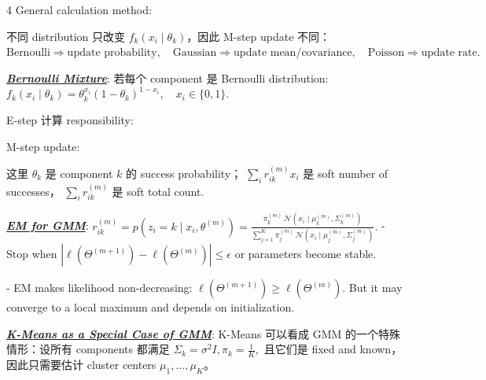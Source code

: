 \documentclass[12pt]{article}
\newcommand{\bulletPoint}[1]{\underline{\textit{\textbf{#1}}}}
\begin{document}
\begin{multicols*}{4}
General calculation method:
{}
{}

不同 distribution 只改变 $f_k(x_i\mid\theta_k)$，因此 M-step update 不同：
$
\text{Bernoulli} \Rightarrow \text{update probability},
\quad
\text{Gaussian} \Rightarrow \text{update mean/covariance},
\quad
\text{Poisson} \Rightarrow \text{update rate}.
$

\bulletPoint{Bernoulli Mixture}:
若每个 component 是 Bernoulli distribution:
$
f_k(x_i\mid\theta_k)=\theta_k^{x_i}(1-\theta_k)^{1-x_i},
\quad x_i\in\{0,1\}.
$

E-step 计算 responsibility:
{}

M-step update:
{}

这里 $\theta_k$ 是 component $k$ 的 success probability；
$\sum_i r_{ik}^{(m)}x_i$ 是 soft number of successes，
$\sum_i r_{ik}^{(m)}$ 是 soft total count.

\bulletPoint{EM for GMM}:
\textcolor{blue!50!black}{$\textstyle
r_{ik}^{(m)}
=
p(z_i=k\mid x_i,\theta^{(m)})
=
\frac{\pi_k^{(m)}\,\mathcal N(x_i\mid \mu_k^{(m)},\Sigma_k^{(m)})}
{\sum_{j=1}^K \pi_j^{(m)}\,\mathcal N(x_i\mid \mu_j^{(m)},\Sigma_j^{(m)})}.
$}
\textcolor{blue!50!black}{}
\textcolor{MidnightBlue}{\boldmath {}}
- Stop when
$
|\ell(\Theta^{(m+1)})-\ell(\Theta^{(m)})|\le \epsilon
$
or parameters become stable.

- EM makes likelihood non-decreasing:
$
\ell(\Theta^{(m+1)})\ge \ell(\Theta^{(m)}).
$
But it may converge to a local maximum and depends on initialization.








\bulletPoint{K-Means as a Special Case of GMM}:
K-Means 可以看成 GMM 的一个特殊情形：设所有 components 都满足
\textcolor{blue!50!black}{$\textstyle
\Sigma_k=\sigma^2 I, \pi_k=\frac{1}{K},
$}
且它们是 fixed and known，因此只需要估计 cluster centers $\mu_1,\dots,\mu_K$。


\end{multicols*}
\end{document}
